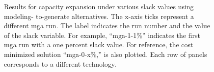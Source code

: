 \begin{figure}[H]
  \centering
  \resizebox{0.95\columnwidth}{!}{}
  \caption{Results for capacity expansion under various slack values using modeling-
  to-generate alternatives. The x-axis ticks represent a different \gls{mga} run.
  The label indicates the run number and the value of the slack variable. For example,
  ``mga-1-1\%'' indicates the first \gls{mga} run with a one percent
  slack value. For reference, the cost minimized solution ``mga-0-x\%,'' is also
  plotted. Each row of panels corresponds to a different technology.}
  \label{fig:uiuc_chw_mga}
\end{figure}

